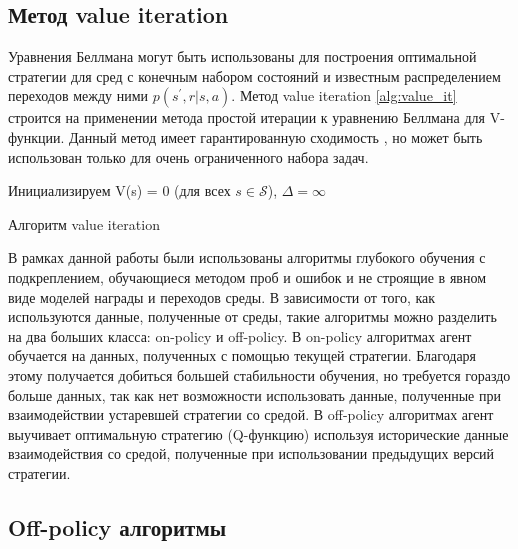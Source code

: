  
\subsection{Метод value iteration}

Уравнения Беллмана могут быть использованы для построения оптимальной стратегии для сред с конечным набором состояний и известным распределением переходов между ними $p(s^{\prime}, r|s, a)$. Метод value iteration \ref{alg:value_it} строится на применении метода простой итерации к уравнению Беллмана для V-функции. Данный метод имеет гарантированную сходимость \cite{Sutton1998}, но может быть использован только для очень ограниченного набора задач.

\begin{algorithm}[ht]
	\SetAlgoLined
	Инициализируем V(s) = 0 (для всех $s \in \mathcal{S}$), $\Delta = \infty$\;
	\caption{Алгоритм value iteration}
	\label{alg:value_it}

\end{algorithm}

В рамках данной работы были использованы алгоритмы глубокого обучения с подкреплением, обучающиеся методом проб и ошибок и не строящие в явном виде моделей награды и переходов среды. В зависимости от того, как используются данные, полученные от среды, такие алгоритмы можно разделить на два больших класса: on-policy и off-policy. В on-policy алгоритмах агент обучается на данных, полученных с помощью текущей стратегии. Благодаря этому получается добиться большей стабильности обучения, но требуется гораздо больше данных, так как нет возможности использовать данные, полученные при взаимодействии устаревшей стратегии со средой. 
В off-policy алгоритмах агент выучивает оптимальную стратегию (Q-функцию) используя исторические данные взаимодействия со средой, полученные при использовании предыдущих версий стратегии. 

\subsection{Off-policy алгоритмы}

